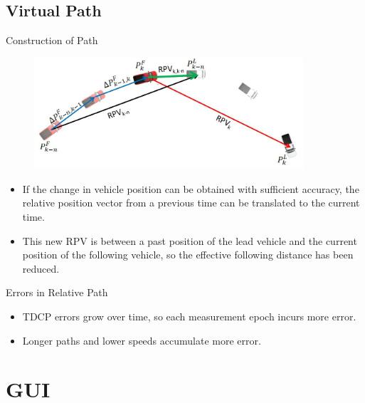 \documentclass{beamer}
\begin{document}
  \subsection{Virtual Path}

    \begin{frame}{Construction of Path}
      \begin{figure}
        \includegraphics[width=10cm]{../graphics/path_algorithm.png}
      \end{figure}
      \begin{itemize} \footnotesize
        \item If the change in vehicle position can be obtained with sufficient accuracy, the relative position vector from a previous time can be translated to the current time.
        \item This new RPV is between a past position of the lead vehicle and the current position of the following vehicle, so the effective following distance has been reduced.
      \end{itemize}
    \end{frame}


    \begin{frame}{Errors in Relative Path}
      \begin{itemize}
        \item TDCP errors grow over time, so each measurement epoch incurs more error.
        \item Longer paths and lower speeds accumulate more error.
      \end{itemize}
    \end{frame}



\section{GUI}
\end{document}
